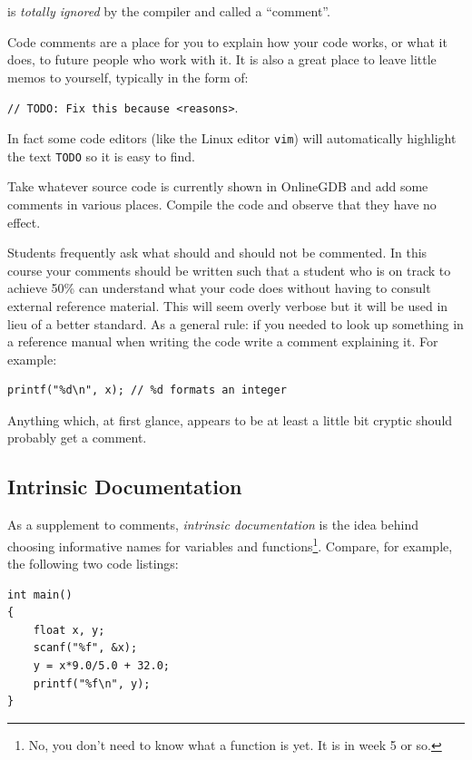 \documentclass{lab}
\begin{document}
is \textit{totally ignored} by the compiler and called a ``comment''.

Code comments are a place for you to explain how your code works, or what it does, to future people who work with it. It is also a great place to leave little memos to yourself, typically in the form of:

\texttt{// TODO: Fix this because <reasons>}.

In fact some code editors (like the Linux editor \texttt{vim}) will automatically highlight the text \texttt{TODO} so it is easy to find.

\begin{task}{}{} Take whatever source code is currently shown in OnlineGDB and add some comments in various places. Compile the code and observe that they have no effect.
\end{task}

Students frequently ask what should and should not be commented. In this course your comments should be written such that a student who is on track to achieve 50\% can understand what your code does without having to consult external reference material. This will seem overly verbose but it will be used in lieu of a better standard. As a general rule: if you needed to look up something in a reference manual when writing the code write a comment explaining it. For example:

\begin{lstlisting}[style=CStyle]
printf("%d\n", x); // %d formats an integer
\end{lstlisting}

Anything which, at first glance, appears to be at least a little bit cryptic should probably get a comment.

\pagebreak
\subsection{Intrinsic Documentation}

As a supplement to comments, \textit{intrinsic documentation} is the idea behind choosing informative names for variables and functions\footnote{No, you don't need to know what a function is yet. It is in week 5 or so.}. Compare, for example, the following two code listings:

\begin{lstlisting}[style=CStyle]
int main()
{
	float x, y;
	scanf("%f", &x);
	y = x*9.0/5.0 + 32.0;
	printf("%f\n", y);
}
\end{lstlisting}
\end{document}
